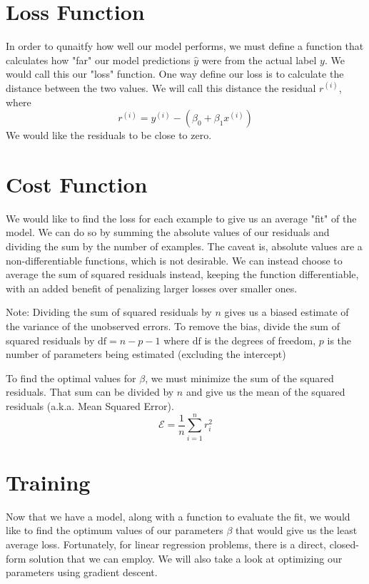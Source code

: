 \documentclass{report}
\begin{document}
\section{Loss Function}
In order to qunaitfy how well our model performs, we must define a function that calculates how "far" our model predictions \(\hat y\) were from the actual label \(y\). We would call this our "loss" function. One way define our loss is to calculate the distance between the two values. We will call this distance the residual \(r^{(i)}\), where \[
	r^{(i)} = y^{(i)} - (\beta_0 + \beta_1 x^{(i)})
\]
We would like the residuals to be close to zero.

\section{Cost Function}
We would like to find the loss for each example to give us an average "fit" of the model. We can do so by summing the absolute values of our residuals and dividing the sum by the number of examples. The caveat is, absolute values are a non-differentiable functions, which is not desirable. We can instead choose to average the sum of squared residuals instead, keeping the function differentiable, with an added benefit of penalizing larger losses over smaller ones.

Note: Dividing the sum of squared residuals by \(n\) gives us a biased estimate of the variance of the unobserved errors. To remove the bias, divide the sum of squared residuals by \(\mathrm{df} = n - p - 1\) where \(\mathrm{df}\) is the degrees of freedom, \(p\) is the number of parameters being estimated (excluding the intercept)

To find the optimal values for \(\beta\), we must minimize the sum of the squared residuals. That sum can be divided by \(n\) and give us the mean of the squared residuals (a.k.a. Mean Squared Error).
\[
	\boxed{\mathcal{E} = \frac{1}{n}\sum_{i=1}^nr_i^2}
\]

\section{Training}
Now that we have a model, along with a function to evaluate the fit, we would like to find the optimum values of our parameters \(\beta\) that would give us the least average loss. Fortunately, for linear regression problems, there is a direct, closed-form solution that we can employ. We will also take a look at optimizing our parameters using gradient descent.
\end{document}
